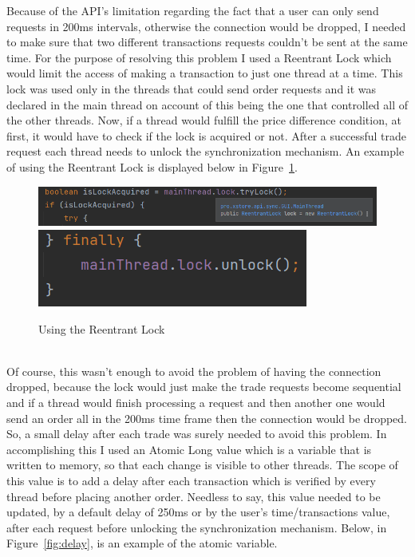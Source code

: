 \documentclass[12pt,a4paper]{report}
\begin{document}
Because of the API's limitation regarding the fact that a user can only send requests in 200ms intervals, otherwise the connection would be dropped, I needed to make sure that two different transactions requests couldn't be sent at the same time. For the purpose of resolving this problem I used a Reentrant Lock which would limit the access of making a transaction to just one thread at a time. This lock was used only in the threads that could send order requests and it was declared in the main thread on account of this being the one that controlled all of the other threads. Now, if a thread would fulfill the price difference condition, at first, it would have to check if the lock is acquired or not. After a successful trade request each thread needs to unlock the synchronization mechanism.
\newpage
An example of using the Reentrant Lock is displayed below in Figure~\ref{fig:lock}.
\begin{figure}[!ht]
	\centering
	\includegraphics[scale=0.7]{pics/lock1.png}
	\includegraphics[scale=0.7]{pics/lock2.png}
	\caption{Using the Reentrant Lock}
	\label{fig:lock}
\end{figure}
\\
Of course, this wasn't enough to avoid the problem of having the connection dropped, because the lock would just make the trade requests become sequential and if a thread would finish processing a request and then another one would send an order all in the 200ms time frame then the connection would be dropped. So, a small delay after each trade was surely needed to avoid this problem. In accomplishing this I used an Atomic Long value which is a variable that is written to memory, so that each change is visible to other threads. The scope of this value is to add a delay after each transaction which is verified by every thread before placing another order. Needless to say, this value needed to be updated, by a default delay of 250ms or by the user's time/transactions value, after each request before unlocking the synchronization mechanism.
Below, in Figure~\ref{fig:delay}, is an example of the atomic variable.
\end{document}
